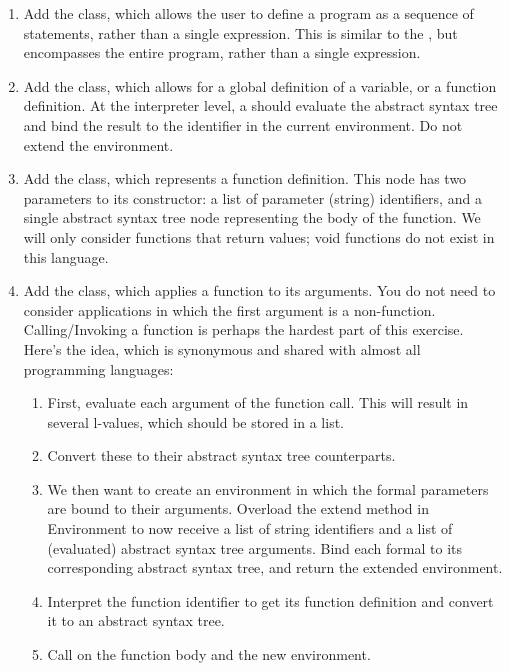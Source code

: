 \begin{enumerate}[label=(\alph*)]
  \item Add the  class, which allows the user to define a program as a sequence of statements, rather than a single expression. This is similar to the , but encompasses the entire program, rather than a single expression.
  \item Add the  class, which allows for a global definition of a variable, or a function definition. At the interpreter level, a  should evaluate the abstract syntax tree and bind the result to the identifier in the current environment. Do not extend the environment.
  \item Add the  class, which represents a function definition. This node has two parameters to its constructor: a list of parameter (string) identifiers, and a single abstract syntax tree node representing the body of the function. We will only consider functions that return values; void functions do not exist in this language. 
  \item Add the  class, which applies a function to its arguments. You do not need to consider applications in which the first argument is a non-function. Calling/Invoking a function is perhaps the hardest part of this exercise. Here's the idea, which is synonymous and shared with almost all programming languages:
  \begin{enumerate}[label=(\roman*)] 
    \item First, evaluate each argument of the function call. This will result in several l-values, which should be stored in a list. 
    \item Convert these to their abstract syntax tree counterparts. 
    \item We then want to create an environment in which the formal parameters are bound to their arguments. Overload the extend method in Environment to now receive a list of string identifiers and a list of (evaluated) abstract syntax tree arguments. Bind each formal to its corresponding abstract syntax tree, and return the extended environment. 
    \item Interpret the function identifier to get its function definition and convert it to an abstract syntax tree.
    \item Call  on the function body and the new environment.

\end{enumerate}
\end{enumerate}
